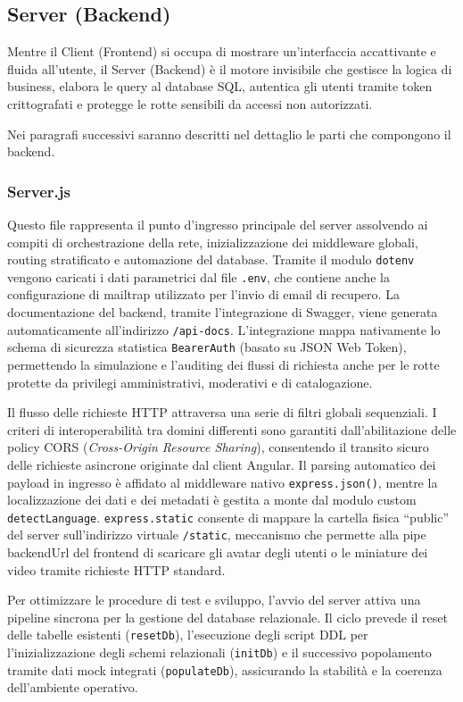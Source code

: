 \documentclass[11pt,a4paper]{article}
\begin{document}
\subsection{Server (Backend)}
Mentre il Client (Frontend) si occupa di mostrare un'interfaccia accattivante e fluida all'utente, il Server (Backend) è il motore invisibile che gestisce la logica di business, elabora le query al database SQL, autentica gli utenti tramite token crittografati e protegge le rotte sensibili da accessi non autorizzati.

Nei paragrafi successivi saranno descritti nel dettaglio le parti che compongono il backend.

\subsubsection{Server.js}
Questo file rappresenta il punto d'ingresso principale del server assolvendo ai compiti di orchestrazione della rete, inizializzazione dei middleware globali, routing stratificato e automazione del database. Tramite il modulo \texttt{dotenv} vengono caricati i dati parametrici dal file \texttt{.env}, che contiene anche la configurazione di mailtrap utilizzato per l’invio di email di recupero. La documentazione del backend, tramite l’integrazione di Swagger, viene generata automaticamente all'indirizzo \texttt{/api-docs}. L'integrazione mappa nativamente lo schema di sicurezza statistica \texttt{BearerAuth} (basato su JSON Web Token), permettendo la simulazione e l'auditing dei flussi di richiesta anche per le rotte protette da privilegi amministrativi, moderativi e di catalogazione. 

Il flusso delle richieste HTTP attraversa una serie di filtri globali sequenziali. I criteri di interoperabilità tra domini differenti sono garantiti dall'abilitazione delle policy CORS (\textit{Cross-Origin Resource Sharing}), consentendo il transito sicuro delle richieste asincrone originate dal client Angular. Il parsing automatico dei payload in ingresso è affidato al middleware nativo \texttt{express.json()}, mentre la localizzazione dei dati e dei metadati è gestita a monte dal modulo custom \texttt{detectLanguage}. \texttt{express.static} consente di mappare la cartella fisica ``public'' del server sull'indirizzo virtuale \texttt{/static}, meccanismo che permette alla pipe backendUrl del frontend di scaricare gli avatar degli utenti o le miniature dei video tramite richieste HTTP standard. 

Per ottimizzare le procedure di test e sviluppo, l'avvio del server attiva una pipeline sincrona per la gestione del database relazionale. Il ciclo prevede il reset delle tabelle esistenti (\texttt{resetDb}), l'esecuzione degli script DDL per l'inizializzazione degli schemi relazionali (\texttt{initDb}) e il successivo popolamento tramite dati mock integrati (\texttt{populateDb}), assicurando la stabilità e la coerenza dell'ambiente operativo.
\end{document}

